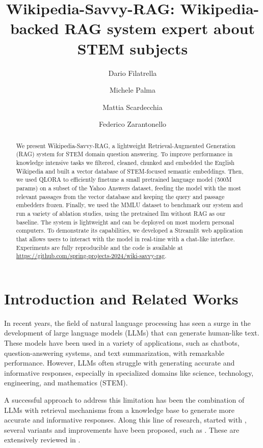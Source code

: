 \documentclass[11pt]{article}
\title{Wikipedia-Savvy-RAG: Wikipedia-backed RAG system expert about STEM subjects}
\author{Dario Filatrella \and Michele Palma \and Mattia Scardecchia \and Federico Zarantonello}
\begin{document}
\maketitle
\begin{abstract}
We present Wikipedia-Savvy-RAG, a lightweight Retrieval-Augmented Generation (RAG) system for
STEM domain question answering. To improve performance in knowledge intensive tasks we filtered, cleaned, 
chunked and embedded the English Wikipedia and built a vector database of STEM-focused semantic embeddings. 
Then, we used QLORA to efficiently finetune a small pretrained language model 
(500M params) on a subset of the Yahoo Answers dataset, feeding the model with the most relevant passages from the 
vector database and keeping the query and passage embedders frozen. Finally, we used the MMLU dataset to 
benchmark our system and run a variety of ablation studies, using the pretrained llm without RAG as our baseline.
The system is lightweight and can be deployed on most modern personal computers. To demonstrate its capabilities,
we developed a Streamlit web application that allows users to interact with the model in real-time with a chat-like interface.
Experiments are fully reproducible and the code is available at \url{https://github.com/spring-projects-2024/wiki-savvy-rag}.

\end{abstract}

\section{Introduction and Related Works}

In recent years, the field of natural language processing has seen a surge in
the development of large language models (LLMs) that can generate human-like text. \cite{gpt3}
These models have been used in a variety of applications, such as chatbots,
question-answering systems, and text summarization, with remarkable performance.  \cite{nlp_applications}
However, LLMs often struggle with generating accurate and informative responses, especially in specialized
domains like science, technology, engineering, and mathematics (STEM).  \cite{hallucinations_llm}

A successful approach to address this limitation has been the combination of LLMs with retrieval
mechanisms from a knowledge base to generate more accurate and informative responses.
Along this line of research, started with \cite{rag_paper}, several variants and improvements have been proposed,
such as \cite{replug} \cite{radit}. These are extensively reviewed in \cite{rag_survey}.
\end{document}
